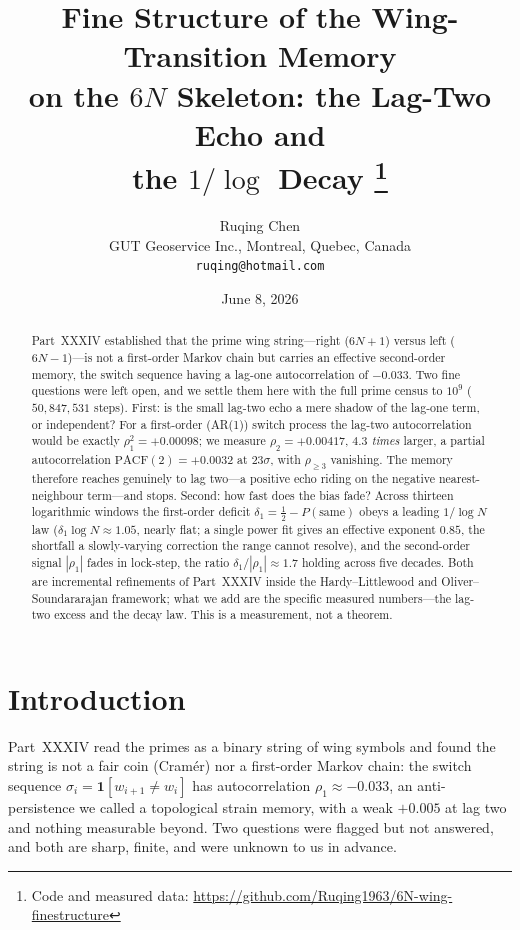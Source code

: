 \documentclass[11pt]{article}
\title{\bf Fine Structure of the Wing-Transition Memory\\
on the $6N$ Skeleton: the Lag-Two Echo and\\
the $1/\log$ Decay%
\thanks{Code and measured data: \url{https://github.com/Ruqing1963/6N-wing-finestructure}}}
\author{Ruqing Chen\\
\small GUT Geoservice Inc., Montreal, Quebec, Canada\\
\small \texttt{ruqing@hotmail.com}}
\date{June 8, 2026}
\begin{document}
\maketitle

\begin{abstract}
Part~XXXIV established that the prime wing string---right ($6N{+}1$) versus left ($6N{-}1$)---is not a
first-order Markov chain but carries an effective second-order memory, the switch sequence having a
lag-one autocorrelation of $-0.033$. Two fine questions were left open, and we settle them here with the
full prime census to $10^{9}$ ($50{,}847{,}531$ steps). First: is the small lag-two echo a mere shadow
of the lag-one term, or independent? For a first-order (AR(1)) switch process the lag-two
autocorrelation would be exactly $\rho_1^2=+0.00098$; we measure $\rho_2=+0.00417$, \emph{$4.3$ times}
larger, a partial autocorrelation $\mathrm{PACF}(2)=+0.0032$ at $23\sigma$, with $\rho_{\ge3}$
vanishing. The memory therefore reaches genuinely to lag two---a positive echo riding on the negative
nearest-neighbour term---and stops. Second: how fast does the bias fade? Across thirteen logarithmic
windows the first-order deficit $\delta_1=\tfrac12-P(\text{same})$ obeys a leading $1/\log N$ law
($\delta_1\log N\approx1.05$, nearly flat; a single power fit gives an effective exponent $0.85$, the
shortfall a slowly-varying correction the range cannot resolve), and the second-order signal $|\rho_1|$
fades in lock-step, the ratio $\delta_1/|\rho_1|\approx1.7$ holding across five decades. Both are
incremental refinements of Part~XXXIV inside the Hardy--Littlewood and Oliver--Soundararajan framework;
what we add are the specific measured numbers---the lag-two excess and the decay law. This is a
measurement, not a theorem.
\end{abstract}

\section{Introduction}
Part~XXXIV \cite{PXXXIV} read the primes as a binary string of wing symbols and found the string is not
a fair coin (Cram\'er) nor a first-order Markov chain: the switch sequence
$\sigma_i=\mathbf{1}[w_{i+1}\ne w_i]$ has autocorrelation $\rho_1\approx-0.033$, an anti-persistence we
called a topological strain memory, with a weak $+0.005$ at lag two and nothing measurable beyond. Two
questions were flagged but not answered, and both are sharp, finite, and were unknown to us in advance.
\end{document}
